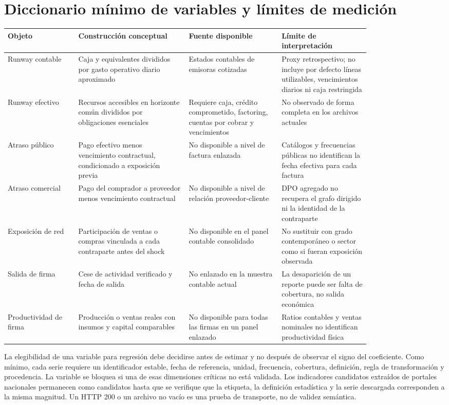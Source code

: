 \documentclass[11pt,a4paper]{article}
\begin{document}
\section{Diccionario mínimo de variables y límites de medición}
\begin{longtable}{>{\raggedright\arraybackslash}p{0.16\linewidth}>{\raggedright\arraybackslash}p{0.25\linewidth}>{\raggedright\arraybackslash}p{0.21\linewidth}>{\raggedright\arraybackslash}p{0.20\linewidth}}
\toprule
Objeto & Construcción conceptual & Fuente disponible & Límite de interpretación\\
\midrule
\endhead
Runway contable & Caja y equivalentes divididos por gasto operativo diario aproximado & Estados contables de emisoras cotizadas & Proxy retrospectivo; no incluye por defecto líneas utilizables, vencimientos diarios ni caja restringida\\
Runway efectivo & Recursos accesibles en horizonte común divididos por obligaciones esenciales & Requiere caja, crédito comprometido, factoring, cuentas por cobrar y vencimientos & No observado de forma completa en los archivos actuales\\
Atraso público & Pago efectivo menos vencimiento contractual, condicionado a exposición previa & No disponible a nivel de factura enlazada & Catálogos y frecuencias públicas no identifican la fecha efectiva para cada factura\\
Atraso comercial & Pago del comprador a proveedor menos vencimiento contractual & No disponible a nivel de relación proveedor-cliente & DPO agregado no recupera el grafo dirigido ni la identidad de la contraparte\\
Exposición de red & Participación de ventas o compras vinculada a cada contraparte antes del shock & No disponible en el panel contable consolidado & No sustituir con grado contemporáneo o sector como si fueran exposición observada\\
Salida de firma & Cese de actividad verificado y fecha de salida & No enlazado en la muestra contable actual & La desaparición de un reporte puede ser falta de cobertura, no salida económica\\
Productividad de firma & Producción o ventas reales con insumos y capital comparables & No disponible para todas las firmas en un panel enlazado & Ratios contables y ventas nominales no identifican productividad física\\
\bottomrule\end{longtable}

La elegibilidad de una variable para regresión debe decidirse antes de estimar y no después de observar el signo del coeficiente. Como mínimo, cada serie requiere un identificador estable, fecha de referencia, unidad, frecuencia, cobertura, definición, regla de transformación y procedencia. La variable se bloquea si una de esas dimensiones críticas no está validada. Los indicadores candidatos extraídos de portales nacionales permanecen como candidatos hasta que se verifique que la etiqueta, la definición estadística y la serie descargada corresponden a la misma magnitud. Un HTTP 200 o un archivo no vacío es una prueba de transporte, no de validez semántica.
\end{document}

